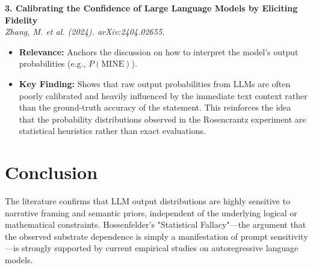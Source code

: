 \documentclass[12pt,a4paper]{article}
\begin{document}
\vspace{1em}
\noindent\textbf{3. Calibrating the Confidence of Large Language Models by Eliciting Fidelity}\\
\textit{Zhang, M. et al. (2024). arXiv:2404.02655.}
\begin{itemize}
    \item \textbf{Relevance:} Anchors the discussion on how to interpret the model's output probabilities (e.g., $P(\text{MINE})$).
    \item \textbf{Key Finding:} Shows that raw output probabilities from LLMs are often poorly calibrated and heavily influenced by the immediate text context rather than the ground-truth accuracy of the statement. This reinforces the idea that the probability distributions observed in the Rosencrantz experiment are statistical heuristics rather than exact evaluations.
\end{itemize}

\section{Conclusion}

The literature confirms that LLM output distributions are highly sensitive to narrative framing and semantic priors, independent of the underlying logical or mathematical constraints. Hossenfelder's "Statistical Fallacy"---the argument that the observed substrate dependence is simply a manifestation of prompt sensitivity---is strongly supported by current empirical studies on autoregressive language models.
\end{document}
